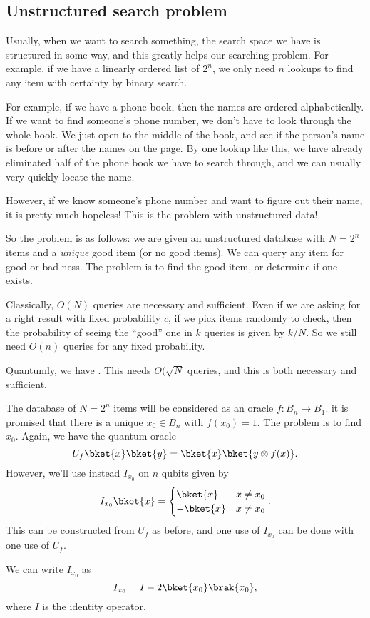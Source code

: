 \documentclass[a4paper]{article}
\makeatletter
\newcommand\addstateend[4]{
  \pgfmathsetmacro{\y@y}{-#2 * 0.7};
  \pgfmathsetmacro{\x@x}{#3};
  \node [left] at (0, \y@y) {#1};
  \node [right] at (\x@x, \y@y) {#4};
  \draw (0, \y@y) -- (\x@x, \y@y);
}
\newcommand\addbigoperator[5]{
  \pgfmathsetmacro{\y@s}{-#2 * 0.7 + 0.2};
  \pgfmathsetmacro{\y@t}{-#3 * 0.7 - 0.2};
  \pgfmathsetmacro{\x@s}{#4};
  \pgfmathsetmacro{\x@t}{#5};
  \pgfmathsetmacro{\x@c}{(\x@s + \x@t)/2};
  \pgfmathsetmacro{\y@c}{(\y@s + \y@t)/2};

  \draw [fill=white] (\x@s, \y@s) rectangle (\x@t, \y@t);
  \node at (\x@c, \y@c) {#1};
}
\makeatother
\begin{document}
\subsection{Unstructured search problem}
Usually, when we want to search something, the search space we have is structured in some way, and this greatly helps our searching problem. For example, if we have a linearly ordered list of $2^n$, we only need $n$ lookups to find any item with certainty by binary search.

For example, if we have a phone book, then the names are ordered alphabetically. If we want to find someone's phone number, we don't have to look through the whole book. We just open to the middle of the book, and see if the person's name is before or after the names on the page. By one lookup like this, we have already eliminated half of the phone book we have to search through, and we can usually very quickly locate the name.

However, if we know someone's phone number and want to figure out their name, it is pretty much hopeless! This is the problem with unstructured data!

So the problem is as follows: we are given an unstructured database with $N = 2^n$ items and a \emph{unique} good item (or no good items). We can query any item for good or bad-ness. The problem is to find the good item, or determine if one exists.

Classically, $O(N)$ queries are necessary and sufficient. Even if we are asking for a right result with fixed probability $c$, if we pick items randomly to check, then the probability of seeing the ``good'' one in $k$ queries is given by $k/N$. So we still need $O(n)$ queries for any fixed probability.

Quantumly, we have . This needs $O(\sqrt{N}$ queries, and this is both necessary and sufficient.

The database of $N = 2^n$ items will be considered as an oracle $f: B_n \to B_1$. it is promised that there is a unique $x_0 \in B_n$ with $f(x_0) = 1$. The problem is to find $x_0$. Again, we have the quantum oracle
\[
  U_f \bket{x}\bket{y} = \bket{x} \bket{y \otimes f(x)}.
\]
However, we'll use instead $I_{x_0}$ on $n$ qubits given by
\[
  I_{x_0}\bket{x} =
  \begin{cases}
    \bket{x} & x \not= x_0\\
    -\bket{x} & x \not= x_0
  \end{cases}.
\]
This can be constructed from $U_f$ as before, and one use of $I_{x_0}$ can be done with one use of $U_f$.
\begin{center}
\end{center}
We can write $I_{x_0}$ as
\[
  I_{x_0} = I - 2 \bket{x_0} \brak{x_0},
\]
where $I$ is the identity operator.
\end{document}
